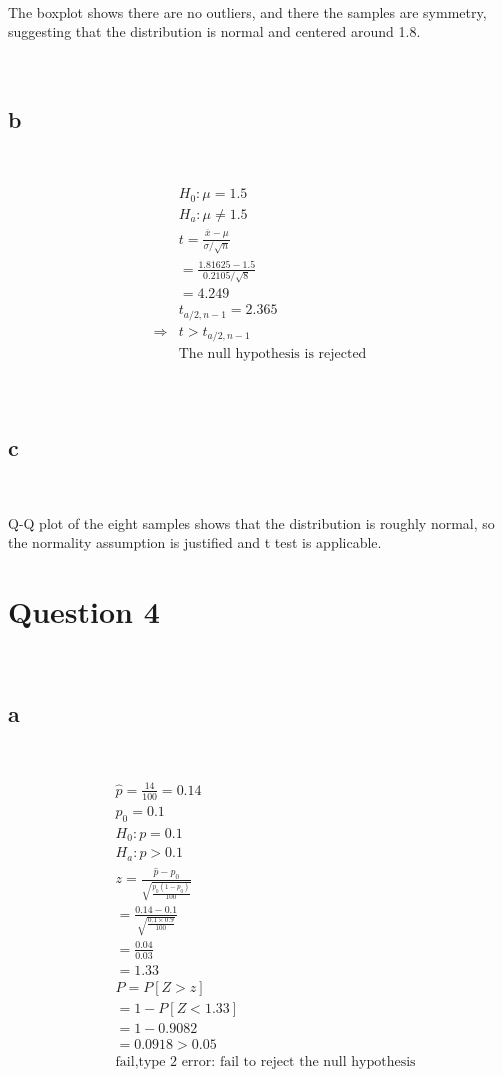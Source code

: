 \documentclass{article}
\begin{document}
~

The boxplot shows there are no outliers, and there the samples are symmetry, suggesting that the distribution is normal and centered around 1.8.

~

\subsection*{b}

~

\begin{align*}
    &H_0:\mu=1.5\\
    &H_a:\mu\ne1.5\\
    &t=\frac{\overline{x}-\mu}{\sigma/\sqrt{n}}\\
    &=\frac{1.81625-1.5}{0.2105/\sqrt{8}}\\
    &=4.249\\
    &t_{a/2,n-1}=2.365\\
    \Rightarrow&t>t_{a/2,n-1}\\
    &\text{The null hypothesis is rejected}\\
\end{align*}

~

\subsection*{c}

~

Q-Q plot of the eight samples shows that the distribution is roughly normal, so the normality assumption is justified and t test is applicable.

\newpage

\section*{Question 4}

~

\subsection*{a}

~

\begin{align*}
    &\hat{p}=\frac{14}{100}=0.14\\
    &p_0=0.1\\
    &H_0:p=0.1\\
    &H_a:p>0.1\\
    &z=\frac{\hat{p}-p_0}{\sqrt{\frac{p_0(1-p_0)}{100}}}\\
    &=\frac{0.14-0.1}{\sqrt{\frac{0.1\times0.9}{100}}}\\
    &=\frac{0.04}{0.03}\\
    &=1.33\\
    &P=P[Z>z]\\
    &=1-P[Z<1.33]\\
    &=1-0.9082\\
    &=0.0918>0.05\\
    &\text{fail,type 2 error: fail to reject the null hypothesis}\\
\end{align*}
\end{document}
